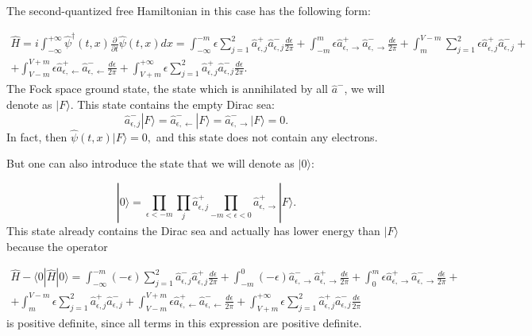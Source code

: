 \documentclass[12pt]{article}
\begin{document}
The second-quantized free Hamiltonian in this case has the following form:

\begin{gather}
	\hat{H} = i \int^{+\infty}_{-\infty}\hat{\psi}^{\dagger}(t,x)\frac{\partial}{\partial t}\hat{\psi}(t,x)dx=\int^{-m}_{-\infty}\epsilon\sum^2_{j=1}\hat{a}^{+}_{\epsilon,j}\hat{a}^{-}_{\epsilon,j}\frac{d\epsilon}{2\pi}+\int^{m}_{-m}\epsilon\hat{a}^{+}_{\epsilon,\rightarrow}\hat{a}^{-}_{\epsilon,\rightarrow}\frac{d\epsilon}{2\pi}+\int^{V-m}_{m}\sum^2_{j=1}\epsilon\hat{a}^{+}_{\epsilon,j}\hat{a}^{-}_{\epsilon,j}+\nonumber \\
	+\int^{V+m}_{V-m}\epsilon\hat{a}^{+}_{\epsilon,\leftarrow}\hat{a}^{-}_{\epsilon,\leftarrow}\frac{d\epsilon}{2\pi}+\int^{+\infty}_{V+m}\epsilon\sum_{j=1}^2\hat{a}^{+}_{\epsilon,j}\hat{a}^{-}_{\epsilon,j}\frac{d\epsilon}{2\pi}.
\end{gather}
The Fock space ground state, the state which is annihilated by all $\hat{a}^-$, we will denote as $|F\rangle$. This state contains the empty Dirac sea:
	\[\hat{a}^{-}_{\epsilon,j}|F\rangle=\hat{a}^{-}_{\epsilon,\leftarrow}|F\rangle=\hat{a}^{-}_{\epsilon,\rightarrow}|F\rangle=0.\]
In fact, then $\hat{\psi}(t,x)|F\rangle=0,$
and this state does not contain any electrons.

But one can also introduce the state that we will denote as $|0\rangle$:

\begin{equation}
    |0\rangle = \prod_{\epsilon<-m}\prod_{j}\hat{a}^{+}_{\epsilon,j}\prod_{-m<\epsilon<0}\hat{a}^{+}_{\epsilon,\rightarrow}|F\rangle.
\end{equation}
This state already contains the Dirac sea and actually has lower energy than $|F\rangle$ because the operator
	
\begin{gather}
    \hat{H} - \langle0|\hat{H}|0\rangle=\int^{-m}_{-\infty}(-\epsilon)\sum_{j=1}^2\hat{a}^{-}_{\epsilon,j}\hat{a}^{+}_{\epsilon,j}\frac{d\epsilon}{2\pi}+\int^{0}_{-m}(-\epsilon)\hat{a}^{-}_{\epsilon,\rightarrow}\hat{a}^{+}_{\epsilon,\rightarrow}\frac{d\epsilon}{2\pi}+\int^{m}_{0}\epsilon\hat{a}^{+}_{\epsilon,\rightarrow}\hat{a}^{-}_{\epsilon,\rightarrow}\frac{d\epsilon}{2\pi}+\nonumber \\ 
	+\int^{V-m}_{m}\epsilon\sum_{j=1}^2\hat{a}^{+}_{\epsilon,j}\hat{a}^{-}_{\epsilon,j}+\int^{V+m}_{V-m}\epsilon\hat{a}^{+}_{\epsilon,\leftarrow}\hat{a}^{-}_{\epsilon,\leftarrow}\frac{d\epsilon}{2\pi}+\int^{+\infty}_{V+m}\epsilon\sum_{j=1}^2\hat{a}^{+}_{\epsilon,j}\hat{a}^{-}_{\epsilon,j}\frac{d\epsilon}{2\pi}
\end{gather}
is positive definite, since all terms in this expression are positive definite. 
\end{document}
